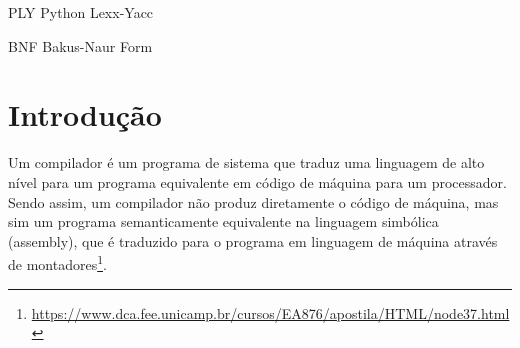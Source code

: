 \documentclass[
	12pt,				%
	openright,			%
	twoside,			%
	a4paper,			%
	english,			%
	french,				%
	spanish,			%
	brazil				%
	]{abntex2}
\begin{document}
\frenchspacing 


\imprimircapa

\imprimirfolhaderosto*


%
%     

\begin{siglas}
  \item[PLY] Python Lexx-Yacc
  \item[BNF] Bakus-Naur Form
\end{siglas}

\tableofcontents*
\cleardoublepage



\textual

\chapter*[Introdução]{Introdução}

Um compilador é um programa de sistema que traduz uma linguagem de alto nível
para um programa equivalente em código de máquina para um processador. Sendo assim,
um compilador não produz diretamente o código de máquina, mas sim um programa
semanticamente equivalente na linguagem simbólica (assembly), que é traduzido para o programa em linguagem de máquina através de montadores\footnote{\url{https://www.dca.fee.unicamp.br/cursos/EA876/apostila/HTML/node37.html}}.
\end{document}
